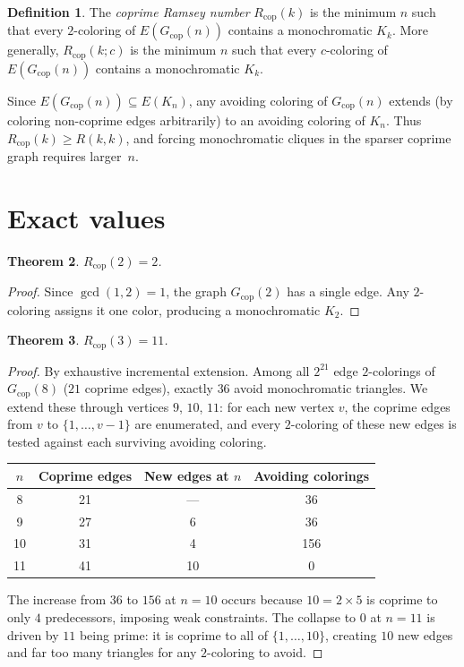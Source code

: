 \documentclass[11pt]{article}
\theoremstyle{plain}
\newtheorem{theorem}{Theorem}[section]
\theoremstyle{definition}
\newtheorem{definition}[theorem]{Definition}
\newcommand{\Rcop}{R_{\mathrm{cop}}}
\newcommand{\Gcop}{G_{\mathrm{cop}}}
\begin{document}
\begin{definition}\label{def:rcop}
The \emph{coprime Ramsey number} $\Rcop(k)$ is the minimum $n$ such
that every $2$-coloring of $E(\Gcop(n))$ contains a monochromatic
$K_k$. More generally, $\Rcop(k;c)$ is the minimum $n$ such that every
$c$-coloring of $E(\Gcop(n))$ contains a monochromatic $K_k$.
\end{definition}

Since $E(\Gcop(n))\subseteq E(K_n)$, any avoiding coloring of
$\Gcop(n)$ extends (by coloring non-coprime edges arbitrarily) to an
avoiding coloring of $K_n$. Thus $\Rcop(k)\ge R(k,k)$, and forcing
monochromatic cliques in the sparser coprime graph requires larger~$n$.

\section{Exact values}\label{sec:exact}

\begin{theorem}\label{thm:rcop2}
$\Rcop(2)=2$.
\end{theorem}

\begin{proof}
Since $\gcd(1,2)=1$, the graph $\Gcop(2)$ has a single edge. Any
$2$-coloring assigns it one color, producing a monochromatic $K_2$.
\end{proof}

\begin{theorem}\label{thm:rcop3}
$\Rcop(3)=11$.
\end{theorem}

\begin{proof}
By exhaustive incremental extension. Among all $2^{21}$ edge
$2$-colorings of $\Gcop(8)$ ($21$ coprime edges), exactly $36$ avoid
monochromatic triangles. We extend these through vertices $9$, $10$,
$11$: for each new vertex $v$, the coprime edges from $v$ to
$\{1,\ldots,v-1\}$ are enumerated, and every $2$-coloring of these new
edges is tested against each surviving avoiding coloring.

\begin{center}
\begin{tabular}{@{}cccc@{}}
\toprule
$n$ & Coprime edges & New edges at $n$ & Avoiding colorings \\
\midrule
8  & 21 & ---  & 36  \\
9  & 27 & 6  & 36  \\
10 & 31 & 4  & 156 \\
11 & 41 & 10 & 0   \\
\bottomrule
\end{tabular}
\end{center}

The increase from $36$ to $156$ at $n=10$ occurs because
$10=2\times 5$ is coprime to only $4$ predecessors, imposing weak
constraints. The collapse to $0$ at $n=11$ is driven by $11$ being
prime: it is coprime to all of $\{1,\ldots,10\}$, creating $10$ new
edges and far too many triangles for any $2$-coloring to avoid.
\end{proof}
\end{document}
